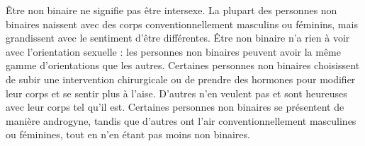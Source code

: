 \documentclass[12pt,openany]{book}
\begin{document}
\begin{figure}[h]
    \centering
\end{figure}

Être non binaire ne signifie pas être intersexe. La plupart des personnes non binaires naissent avec des corps conventionnellement masculins ou féminins, mais grandissent avec le sentiment d’être différentes. Être non binaire n’a rien à voir avec l’orientation sexuelle : les personnes non binaires peuvent avoir la même gamme d’orientations que les autres. Certaines personnes non binaires choisissent de subir une intervention chirurgicale ou de prendre des hormones pour modifier leur corps et se sentir plus à l’aise. D’autres n’en veulent pas et sont heureuses avec leur corps tel qu’il est. Certaines personnes non binaires se présentent de manière androgyne, tandis que d’autres ont l’air conventionnellement masculines ou féminines, tout en n’en étant pas moins non binaires.
\end{document}
